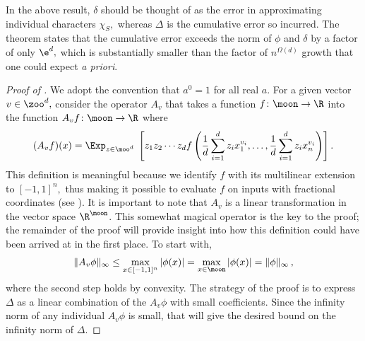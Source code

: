In the above result, $\delta$ should be thought of as
the error in approximating individual characters
$\chi_S,$ whereas $\Delta$ is the cumulative error
so incurred.  The theorem states that the cumulative error
exceeds the norm of $\phi$ and $\delta$ by a factor of
only $\e^d,$ which is substantially smaller than the
factor of $n^{\Omega(d)}$ growth that one could expect
\emph{a priori}.

\begin{proof}[Proof of ]
We adopt
the convention that $a^0=1$ for all real $a$. For a
given vector $v\in\zoo^d,$ consider the 
operator $A_v$ that takes 
a function $f\colon\moon\to\R$ into
%
%
%
the
%
function $A_vf\colon\moon\to\R$ where
\begin{align*}
(A_vf)(x) = 
\Exp_{z\in\moo^d} \;\left[ z_1z_2\cdots z_df\left(\frac1d\sum_{i=1}^d
z_ix_1^{v_i}, \dots,
                     \frac1d\sum_{i=1}^d
					 z_ix_n^{v_i}\right)\right].
\end{align*}
This definition is meaningful because we identify $f$
with its multilinear extension to $[-1,1]^n,$ thus making
it possible to evaluate $f$ on inputs with fractional
coordinates (see ). 
It is important to note that $A_v$ is a linear
transformation in the vector space $\R^{\moon}$.
This somewhat magical operator is the key to the
proof; the remainder of the proof will provide insight
into how this definition could have been arrived at in the
first place. To start with, 
\begin{align}
\|A_v\phi\|_\infty \leq
\max_{x\in[-1,1]^n}|\phi(x)| = 
\max_{x\in\moon}|\phi(x)| = \|\phi\|_\infty\,,
\label{eqn:A_v-small}
\end{align}
where the second step holds by convexity.  The strategy
of the proof is to express $\Delta$ as a linear
combination of the $A_v\phi$ with small coefficients.
Since the infinity norm of any individual $A_v\phi$
is small, that will give the desired bound on the
infinity norm of $\Delta$. 


\end{proof}
